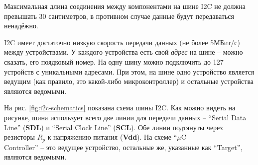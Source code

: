 \documentclass[../sparc.tex]{subfiles}
\begin{document}
Максимальная длина соединения между компонентами на шине \gls{I2C} не должна
превышать 30 сантиметров, в противном случае данные будут передаваться
ненадёжно.

\gls{I2C} имеет достаточно низкую скорость передачи данных (не более 5МБит/с)
между устройствами. У каждого устройства есть свой \textit{адрес} на шине --
можно сказать, его поядковый номер. На одну шину можно подключить до 127
устройств с уникальными адресами. При этом, на шине одно устройство является
ведущим (как правило, это какой-либо микроконтроллер) и остальные устройства
являются ведомыми.

На рис. \ref{fig:i2c-schematics} показана схема шины \gls{I2C}. Как можно видеть
на рисунке, шина использует всего две линии для передачи данных -- ``Serial Data
Line'' (\textbf{SDL}) и ``Serial Clock Line'' (\textbf{SCL}). Обе линии
подтянуты через резисторы \textbf{$R_p$} к напряжению питания (\textbf{Vdd}). На
схеме ``$\mu$C\\Controller'' -- это ведущее устройство, остальные же, указанные как
``Target'', являются ведомыми.
\end{document}
